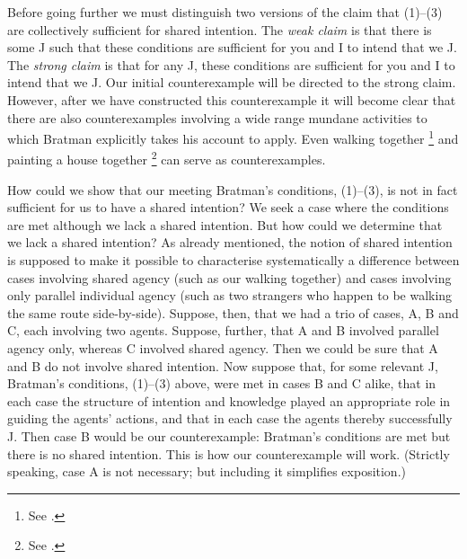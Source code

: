 \documentclass[12pt,\papersize]{extarticle}
\begin{document}
Before going further we must distinguish two versions of the claim that (1)--(3) are collectively sufficient for shared intention.
The \emph{weak claim} is that there is some J such that these conditions are sufficient for you and I to intend that we J.
The \emph{strong claim} is that for any J, these conditions are sufficient for you and I to intend that we J. 
Our initial counterexample will be directed to the strong claim.
However, after we have constructed this counterexample it will become clear that there are also counterexamples involving a wide range mundane activities to which Bratman explicitly takes his account to apply.
Even walking together%
	\footnote{
	See \citet[p.\ 150]{Bratman:2009lv}.
	}
and painting a house together%
	\footnote{
	See \citet[p.\ 331]{Bratman:1992mi}.
	}
can serve as counterexamples.
 



How could we show that our meeting Bratman's conditions, (1)--(3), is not in fact sufficient for us to have a shared intention? 
We seek a case where the conditions are met although we lack a shared intention.
But how could we determine that we lack a shared intention?
As already mentioned, the notion of shared intention is supposed to 
	make it possible to 
	characterise systematically a difference between 
		cases involving shared agency (such as our walking together)
		and
		cases involving only parallel  individual agency (such as two strangers who happen to be walking the same route side-by-side). 
Suppose, then, that we had a trio of cases, A, B and C, each involving two agents.
Suppose, further, that A and B involved parallel agency only, whereas C involved shared agency.
Then we could be sure that A and B do not involve shared intention.
Now suppose 
	that, for some relevant J, Bratman's conditions, (1)--(3) above, were met in cases B and C alike, 
	that in each case the structure of intention and knowledge played an appropriate role in guiding the agents' actions,
	and that in each case the agents thereby successfully J.
Then case B would be our counterexample:
Bratman's conditions are met but there is no shared intention.
This is how our counterexample will work.
(Strictly speaking, case A is not necessary; but including it simplifies exposition.)
\end{document}
